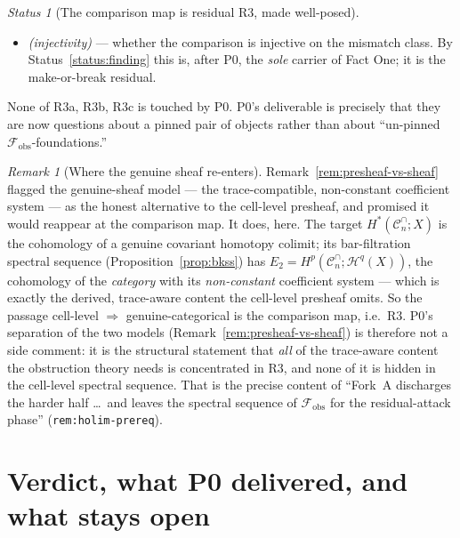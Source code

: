\documentclass[11pt,oneside]{amsart}
\theoremstyle{plain}
\theoremstyle{definition}
\theoremstyle{remark}
\newtheorem{remark}[theorem]{Remark}
\theoremstyle{honeststyle}
\newtheorem{status}[theorem]{Status}
\newcommand{\Cn}{\mathcal{C}^{\cap}_n}
\newcommand{\fobs}{\mathcal{F}_{\mathrm{obs}}}
\newcommand{\Uf}{\mathfrak{U}}
\begin{document}
\begin{status}[The comparison map is residual R3, made well-posed]
\begin{itemize}[leftmargin=1.6em]
  comparison carries it to total degree $n-1$ in $H^{*}(\Cn;X)$.
  P0 pins the bigradings on both sides --- \v{C}ech-degree on $\Uf$
  versus bar-degree on $\Cn$, with the cubical $q$-degree shared ---
  so that ``what degree does it land in'' is a precise computation,
  not a re-label inherited from the defunct pre-Fork-A object
  (\texttt{rem:promotion}).
\item[\textbf{R3c}] \emph{(injectivity)} --- whether the comparison is
  injective on the mismatch class. By Status~\ref{status:finding} this
  is, after P0, the \emph{sole} carrier of Fact One; it is the
  make-or-break residual.
\end{itemize}
None of R3a, R3b, R3c is touched by P0. P0's deliverable is precisely
that they are now questions about a pinned pair of objects rather than
about ``un-pinned $\fobs$-foundations.''
\end{status}

\begin{remark}[Where the genuine sheaf re-enters]
\label{rem:sheaf-reenters}
Remark~\ref{rem:presheaf-vs-sheaf} flagged the genuine-sheaf model ---
the trace-compatible, non-constant coefficient system --- as the
honest alternative to the cell-level presheaf, and promised it would
reappear at the comparison map. It does, here. The target
$H^{*}(\Cn;X)$ is the cohomology of a genuine covariant homotopy
colimit; its bar-filtration spectral sequence
(Proposition~\ref{prop:bkss}) has $E_{2}=H^{p}(\Cn;\mathcal
H^{q}(X))$, the cohomology of the \emph{category} with its
\emph{non-constant} coefficient system --- which is exactly the
derived, trace-aware content the cell-level presheaf omits. So the
passage cell-level $\Rightarrow$ genuine-categorical is the comparison
map, i.e.\ R3. P0's separation of the two models
(Remark~\ref{rem:presheaf-vs-sheaf}) is therefore not a side comment:
it is the structural statement that \emph{all} of the trace-aware
content the obstruction theory needs is concentrated in R3, and none
of it is hidden in the cell-level spectral sequence. That is the
precise content of ``Fork~A discharges the harder half \dots\ and
leaves the spectral sequence of $\fobs$ for the residual-attack
phase'' (\texttt{rem:holim-prereq}).
\end{remark}

\section{Verdict, what P0 delivered, and what stays open}
\label{sec:verdict}
\end{document}
